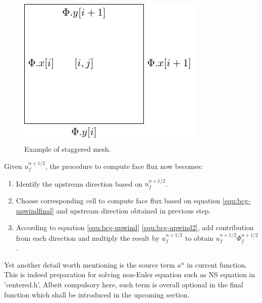 \begin{figure}[H]
     \centering
     \includegraphics{image/bcg-h/staggered.pdf}
     \caption{Example of staggered mesh.}
     \label{fig:bcg-staggered}
\end{figure}
Given $u_f^{n+1/2}$, the procedure to compute face flux now becomes:
\begin{enumerate}
    \item Identify the upstream direction based on $u_f^{n+1/2}$.
    \item Choose corresponding cell to compute face flux based on equation \ref{equ:bcg-upwindfinal} and upstream direction obtained in previous step.
    \item According to equation \ref{equ:bcg-upwind} \ref{equ:bcg-upwind2}, add contribution from each direction and multiply the result by $u_f^{n+1/2}$ to obtain $u_f^{n+1/2}\Phi_f^{n+1/2}$.
\end{enumerate}
Yet another detail worth mentioning is the source term $a^n$ in current function. This is indeed preparation for solving non-Euler equation such as NS equation in 'centered.h'. Albeit compulsory here, such term is overall optional in the final function  which shall be introduced in the upcoming section.

